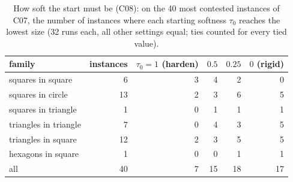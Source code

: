 \begin{table}[t]\centering\small
\begin{tabular}{lrrrrr}
\toprule
family & instances & $\tau_0=1$ (harden) & $0.5$ & $0.25$ & $0$ (rigid)\\
\midrule
squares in square & 6 & 3 & 4 & 2 & 0\\
squares in circle & 13 & 2 & 3 & 6 & 5\\
squares in triangle & 1 & 0 & 1 & 1 & 1\\
triangles in triangle & 7 & 0 & 4 & 3 & 5\\
triangles in square & 12 & 2 & 3 & 5 & 5\\
hexagons in square & 1 & 0 & 0 & 1 & 1\\
\midrule
all & 40 & 7 & 15 & 18 & 17\\
\bottomrule
\end{tabular}
\caption{How soft the start must be (C08): on the 40 most contested instances of C07, the number of instances where each starting softness $\tau_0$ reaches the lowest size (32 runs each, all other settings equal; ties counted for every tied value).}
\label{tab:tau}
\end{table}
